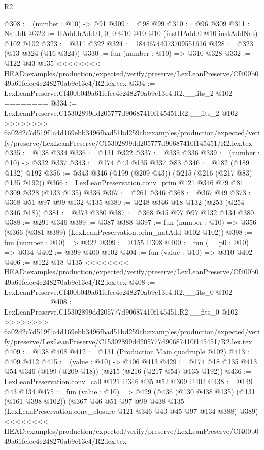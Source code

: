 \begin{lexlean}{R2}
\begin{coremodule}
{{{{{{{{{@308 := (number : @10) -> @91
@309 := @98 @99
@310 := @96 @309
@311 := Nat.blt
@322 := HAdd.hAdd.{0, 0, 0} @10 @10 @10 (instHAdd.{0} @10 instAddNat) @102 @102
@323 := @311 @322
@324 := 18446744073709551616
@328 := @323 (@13 @324 (@16 @324))
@330 := fun (number : @10) => @310 @328
@332 := @122 @43 @135
<<<<<<<< HEAD:examples/production/expected/verify/preserve/LexLeanPreserve/Cf400b049a61fefec4c248270ab9c13e4/R2.lex.tex
@334 := LexLeanPreserve.Cf400b049a61fefec4c248270ab9c13e4.R2.__fits_2 @102
========
@334 := LexLeanPreserve.C15302899dd205777d90687410f145451.R2.__fits_2 @102
>>>>>>>> 6a02d2c7d519f1a4d169ebb3496fbad51bd259cb:examples/production/expected/verify/preserve/LexLeanPreserve/C15302899dd205777d90687410f145451/R2.lex.tex
@335 := @138 @334
@336 := @131 @322
@337 := @335 @336
@339 := (number : @10) -> @332 @337
@343 := @174 @43 @135 @337 @83
@346 := @182 (@189 @132) @192
@356 := @343 @346 (@199 (@209 @43)) (@215 (@216 (@217 @83) @135 @192))
@366 := LexLeanPreservation.conv_prim @121 @346 @79 @81 @309 @328 (@133 @135) @336
@367 := @261 @346
@368 := @367 @49
@373 := @368 @51 @97 @99 @132 @135
@380 := @248 @346 @18 @132 (@253 (@254 @346 @18))
@381 := @373 @380
@387 := @368 @45 @97 @97 @132 @134 @380
@388 := @291 @346
@389 := @387 @388
@397 := fun (number : @10) => @356 (@366 (@381 @389) (LexLeanPreservation.prim_natAdd @102 @102))
@398 := fun (number : @10) => @322
@399 := @155 @398
@400 := fun (__p0 : @10) => @334
@402 := @399 @400 @102
@404 := fun (value : @10) => @310 @402
@406 := @122 @18 @135
<<<<<<<< HEAD:examples/production/expected/verify/preserve/LexLeanPreserve/Cf400b049a61fefec4c248270ab9c13e4/R2.lex.tex
@408 := LexLeanPreserve.Cf400b049a61fefec4c248270ab9c13e4.R2.__fits_0 @102
========
@408 := LexLeanPreserve.C15302899dd205777d90687410f145451.R2.__fits_0 @102
>>>>>>>> 6a02d2c7d519f1a4d169ebb3496fbad51bd259cb:examples/production/expected/verify/preserve/LexLeanPreserve/C15302899dd205777d90687410f145451/R2.lex.tex
@409 := @138 @408
@412 := @131 (Production.Main.quadruple @102)
@413 := @409 @412
@415 := (value : @10) -> @406 @413
@429 := @174 @18 @135 @413 @54 @346 (@199 (@209 @18)) (@215 (@216 (@217 @54) @135 @192))
@436 := LexLeanPreservation.conv_call @121 @346 @35 @52 @309 @402
@438 := @149 @43 @134
@475 := fun (value : @10) =>
  @429
    (@436
      (@130 @438 @135)
      (@131 (@161 @398 @102))
      (@367
        @46
        @51
        @97
        @99
        @438
        @135
        (LexLeanPreservation.conv_closure @121 @346 @43 @45 @97 @134 @388)
        @389)
<<<<<<<< HEAD:examples/production/expected/verify/preserve/LexLeanPreserve/Cf400b049a61fefec4c248270ab9c13e4/R2.lex.tex
}}}}}}}}}
\end{coremodule}
\end{lexlean}
